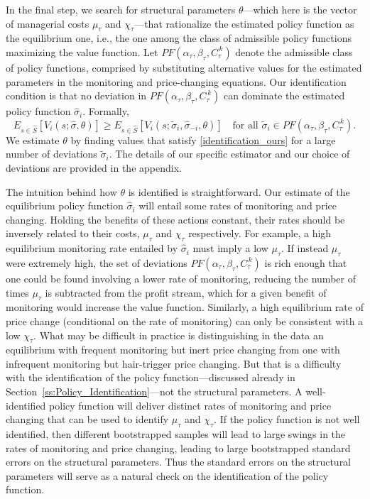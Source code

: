 \documentclass[11pt]{article}
\newcommand{\cut}[1]{C_{\tau}^{\,#1}}
\begin{document}
\begin{spacing}{1.3}
In the final step, we search for structural parameters
$\theta$---which here is the vector of managerial costs $\mu_\tau$ and
$\chi_\tau$---that rationalize the estimated policy function as the
equilibrium one, i.e., the one among the class of admissible policy
functions maximizing the value function.  Let
$PF(\alpha_{\tau},\beta_{\tau},\cut{k})$ denote the admissible class
of policy functions, comprised by substituting alternative values for
the estimated parameters in the monitoring and price-changing
equations.  Our identification condition is that no deviation in
$PF(\alpha_{\tau},\beta_{\tau},\cut{k})$ can dominate the estimated
policy function $\hat{\sigma}_{i}$. Formally,
\begin{equation}
\label{identification_ours}
 E_{s\in\hat{S}} [ V_{i}(s;\hat{\sigma},\theta )] \geq E_{s\in\hat{S}}
 [V_i(s;\tilde{\sigma}_i, \hat{\sigma}_{-i}, \theta )] \quad \text{for
   all $\tilde{\sigma}_i \in PF(\alpha_{\tau},\beta_{\tau},\cut{k})$}.
\end{equation}
We estimate $\theta$ by finding values that satisfy
\eqref{identification_ours} for a large number of deviations
$\tilde{\sigma}_i$. The details of our specific estimator and our
choice of deviations are provided in the appendix.

The intuition behind how $\theta$ is identified is
straightforward. Our estimate of the equilibrium policy function
$\hat{\sigma}_{i}$ will entail some rates of monitoring and price
changing. Holding the benefits of these actions constant, their rates
should be inversely related to their costs, $\mu_\tau$ and $\chi_\tau$
respectively. For example, a high equilibrium monitoring rate entailed
by $\hat{\sigma}_{i}$ must imply a low $\mu_\tau$. If instead
$\mu_\tau$ were extremely high, the set of deviations
$PF(\alpha_{\tau},\beta_{\tau},\cut{k})$ is rich enough that one could
be found involving a lower rate of monitoring, reducing the number of
times $\mu_\tau$ is subtracted from the profit stream, which for a
given benefit of monitoring would increase the value
function. Similarly, a high equilibrium rate of price change
(conditional on the rate of monitoring) can only be consistent with a
low $\chi_\tau$. What may be difficult in practice is distinguishing
in the data an equilibrium with frequent monitoring but inert price
changing from one with infrequent monitoring but hair-trigger price
changing. But that is a difficulty with the identification of the
policy function---discussed already in
Section~\ref{ss:Policy_Identification}---not the structural
parameters. A well-identified policy function will deliver distinct
rates of monitoring and price changing that can be used to identify
$\mu_\tau$ and $\chi_\tau$. If the policy function is not well
identified, then different bootstrapped samples will lead to large
swings in the rates of monitoring and price changing, leading to large
bootstrapped standard errors on the structural parameters. Thus the
standard errors on the structural parameters will serve as a natural
check on the identification of the policy function.


\end{spacing}
\end{document}

